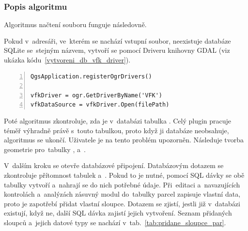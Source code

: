 \subsubsection{Popis algoritmu}
\label{popis_algoritmu_nacteni_vfk}

Algoritmus načtení  souboru funguje následovně.

Pokud v~adresáři, ve~kterém se nachází vstupní  soubor, neexistuje databáze SQLite se~stejným názvem, vytvoří se pomocí  Driveru knihovny GDAL (viz ukázka kódu~\ref{vytvoreni_db_vfk_driver}).

{\scriptsize
\begin{lstlisting}[style=python, caption={Vytvoření SQLite databáze pomocí VFK Driveru}, captionpos=b, label=vytvoreni_db_vfk_driver, backgroundcolor = \color{light-gray},  numbers=left]
QgsApplication.registerOgrDrivers()

vfkDriver = ogr.GetDriverByName('VFK')
vfkDataSource = vfkDriver.Open(filePath)
\end{lstlisting}}

Poté algoritmus zkontroluje, zda je v~databázi tabulka \texttt{}. Celý plugin pracuje téměř výhradně právě s~touto tabulkou, proto když ji databáze neobsahuje, algoritmus se ukončí. Uživatele je na tento problém upozorněn. Následuje tvorba geometrie pro~tabulky \texttt{}, \texttt{} a~\texttt{}.

V~dalším kroku se otevře databázové připojení. Databázovým dotazem se zkontroluje přítomnost tabulek \texttt{} a~\texttt{}. Pokud to je nutné, pomocí SQL dávky se obě tabulky vytvoří a~nahrají se do nich potřebné údaje. Při~editaci a~navazujících kontrolách a~analýzách zásuvný modul do~tabulky parcel zapisuje vlastní data, proto je zapotřebí přidat vlastní sloupce. Dotazem se zjistí, jestli již v~databázi existují, když ne, další SQL dávka zajistí jejich vytvoření. Seznam přidaných sloupců a~jejich datové typy se nachází v~tab.~\ref{tab:pridane_sloupce_par}.

